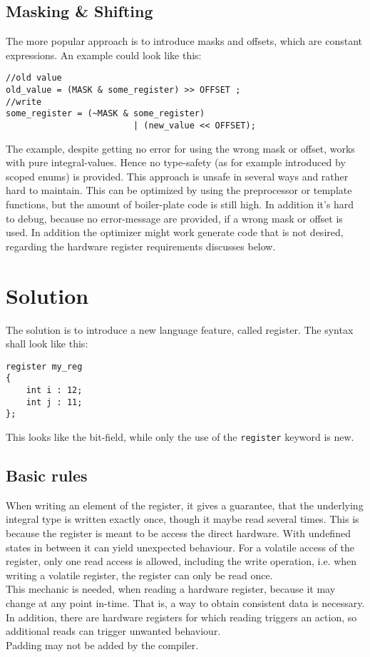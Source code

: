 \documentclass{report}
\begin{document}
\section{Masking \& Shifting}
The more popular approach is to introduce masks and offsets, which are constant expressions. 
An example could look like this:
\begin{lstlisting}
//old value
old_value = (MASK & some_register) >> OFFSET ;
//write
some_register = (~MASK & some_register) 
                         | (new_value << OFFSET);  
\end{lstlisting}
The example, despite getting no error for using the wrong mask or offset, works with pure integral-values. Hence no type-safety (as for example introduced by scoped enums) is provided. This approach is unsafe in several ways and rather hard to maintain. This can be optimized by using the preprocessor or template functions, but the amount of boiler-plate code is still high. In addition it's hard to debug, because no error-message are provided, if a wrong mask or offset is used. In addition the optimizer might work generate code that is not desired, regarding the hardware register requirements discusses below.

\chapter{Solution}
The solution is to introduce a new language feature, called register. The syntax shall look like this:

\begin{lstlisting}
register my_reg
{
	int i : 12;
	int j : 11;
};
\end{lstlisting}
This looks like the bit-field, while only the use of the \lstinline {register} keyword is new.

\section{Basic rules}
When writing an element of the register, it gives a guarantee, that the underlying integral type is written exactly once, though it maybe read several times. This is because the register is meant to be access the direct hardware. With undefined states in between it can yield unexpected behaviour. For a volatile access of the register, only one read access is allowed, including the write operation, i.e. when writing a volatile register, the register can only be read once.\\
This mechanic is needed, when reading a hardware register, because it may change at any point in-time. That is, a way to obtain consistent data is necessary. In addition, there are hardware registers for which reading triggers an action, so additional reads can trigger unwanted behaviour.\\
Padding may not be added by the compiler.
\end{document}
